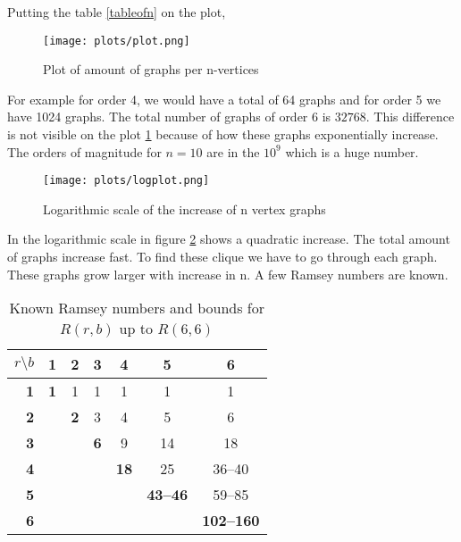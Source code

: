 \documentclass{Assignment}
\begin{document}
Putting the table \ref{tableofn} on the plot,
\begin{figure}[H]
	\centering
	\texttt{[image: plots/plot.png]}
	\caption{Plot of amount of graphs per n-vertices}
	\label{plot}
\end{figure}
For example for order 4, we would have a total of 64 graphs and for order 5 we have 1024 graphs.
The total number of graphs of order 6 is $32768$.
This difference is not visible on the plot \ref{plot} because of how these graphs exponentially increase.
The orders of magnitude for $n= 10$ are in the $10^{9}$ which is a huge number.
\begin{figure}[H]
	\centering
	\texttt{[image: plots/logplot.png]}
	\caption{Logarithmic scale of the increase of n vertex graphs}
	\label{logplot}
\end{figure}
In the logarithmic scale in figure \ref{logplot} shows a quadratic increase.
The total amount of graphs increase fast.
To find these clique we have to go through each graph.
These graphs grow larger with increase in n.
A few Ramsey numbers are known.
\begin{table}[H]
	\centering
	
	\label{tab:ramsey_matrix_upto_6_6}
	\begin{adjustbox}{max width=\textwidth} 
		\begin{tabular}{| r | c | c | c | c | c | c |} 
			\toprule
			\multicolumn{1}{|c|}{$r \setminus b$} & 1 & 2 & 3 & 4 & 5 & 6 \\
			\midrule
			\textbf{1} & \textbf{1} & 1 & 1 & 1 & 1 & 1 \\\hline
			\textbf{2} & & \textbf{2} & 3 & 4 & 5 & 6 \\\hline
			\textbf{3} & & & \textbf{6} & 9 & 14 & 18 \\\hline
			\textbf{4} & & & & \textbf{18} & 25 & 36--40 \\\hline
			\textbf{5} & & & & & \textbf{43--46} & 59--85 \\\hline
			\textbf{6} & & & & & & \textbf{102--160} \\
			\bottomrule
		\end{tabular}
	\end{adjustbox}
	\vspace{0.5cm}
	\small 	\caption{ Known Ramsey numbers and bounds for $R(r,b)$  up to $R(6,6)$ \cite{GreenwoodGleason1955}}
\end{table}
\end{document}
